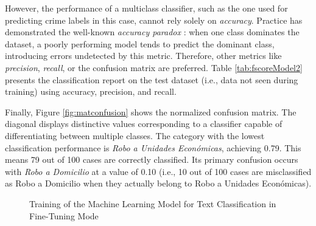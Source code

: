 \documentclass[onecolumn, journal, english, 12pt, a4paper]{IEEEtran} %
\theoremstyle{definition}
\begin{document}
However, the performance of a multiclass classifier, such as the one
used for predicting crime labels in this case, cannot rely solely on
\emph{accuracy}. Practice has demonstrated the well-known
\emph{accuracy paradox} \cite{abma2009evaluation}: when
one class dominates the dataset, a poorly performing model tends to
predict the dominant class, introducing errors undetected by this
metric. Therefore, other metrics like \emph{precision}, \emph{recall},
or the confusion matrix are preferred. Table \ref{tab:fscoreModel2}
presents the classification report on the test dataset (i.e., data not
seen during training) using accuracy, precision, and recall.

Finally, Figure \ref{fig:matconfusion} shows the normalized confusion
matrix. The diagonal displays distinctive values corresponding to a
classifier capable of differentiating between multiple classes. The
category with the lowest classification performance is \emph{Robo a
  Unidades Económicas}, achieving 0.79. This means 79 out of 100 cases
are correctly classified. Its primary confusion occurs with \emph{Robo
  a Domicilio} at a value of 0.10 (i.e., 10 out of 100 cases are
misclassified as Robo a Domicilio when they actually belong to Robo a
Unidades Económicas).

\begin{figure}[!t]
\centering
{}
\hfil
{}
\caption{Training of the Machine Learning Model for Text Classification in Fine-Tuning Mode}
\label{fig:results}
\end{figure}
\end{document}
